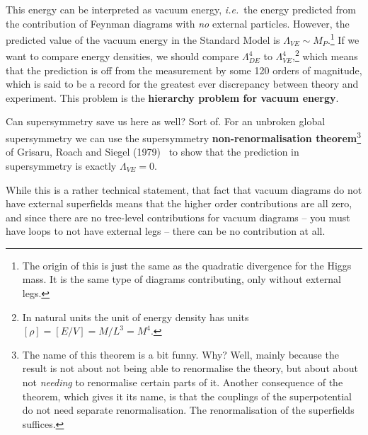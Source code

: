 \documentclass[notes.tex]{subfiles}
\begin{document}
This energy can be interpreted as vacuum energy, {\it i.e.}\ the energy predicted from the contribution of Feynman diagrams with {\it no} external particles. However, the predicted value of the vacuum energy in the Standard Model is $\Lambda_{VE} \sim M_P$.\footnote{The origin of this is just the same as the quadratic divergence for the Higgs mass. It is the same type of diagrams contributing, only without external legs.} If we want to compare energy densities, we should compare $\Lambda_{DE}^4$ to $\Lambda_{VE}^4$,\footnote{In natural units the unit of energy density has units $[\rho]=[E/V]=M/L^3=M^4$.} which means that the prediction is off from the measurement by some 120 orders of magnitude, which is said to be a record for the greatest ever discrepancy between theory and experiment. This problem is the {\bf hierarchy problem for vacuum energy}.

Can supersymmetry save us here as well? Sort of. For an unbroken global supersymmetry we can use the supersymmetry {\bf non-renormalisation theorem}\footnote{The name of this theorem is a bit funny. Why? Well, mainly because the result is not about not being able to renormalise the theory, but about about not {\it needing} to renormalise certain parts of it. Another consequence of the theorem, which gives it its name, is that the couplings of the superpotential do not need separate renormalisation. The renormalisation of the superfields suffices.}
of Grisaru, Roach and Siegel (1979)~\cite{Grisaru:1979wc} to show that the prediction in supersymmetry is exactly $\Lambda_{VE} = 0$.


While this is a rather technical statement, that fact that vacuum diagrams do not have external superfields means that the higher order contributions are all zero, and since there are no tree-level contributions for vacuum diagrams -- you must have loops to not have external legs -- there can be no contribution at all. 
\end{document}
